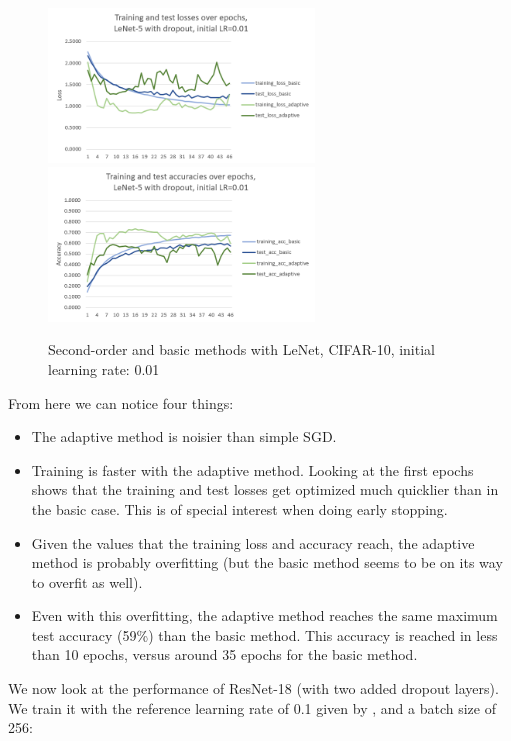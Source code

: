 \documentclass{article}
\begin{document}
  \begin{figure}[!h]
  	\includegraphics[width=200pt]{loss_lenet_d_0_01.png}
  	\includegraphics[width=200pt]{acc_lenet_d_0_01.png}
  	\caption{Second-order and basic methods with LeNet, CIFAR-10, initial learning rate: 0.01}
  \end{figure}

  From here we can notice four things:\\
  \begin{itemize}
  	\item The adaptive method is noisier than simple SGD.
  	\item Training is faster with the adaptive method. Looking at the first epochs shows that the training and test losses get optimized much quicklier than in the basic case. This is of special interest when doing early stopping.
  	\item Given the values that the training loss and accuracy reach, the adaptive method is probably overfitting (but the basic method seems to be on its way to overfit as well).
  	\item Even with this overfitting, the adaptive method reaches the same maximum test accuracy (59\%) than the basic method. This accuracy is reached in less than 10 epochs, versus around 35 epochs for the basic method. 
  \end{itemize}

  We now look at the performance of ResNet-18 (with two added dropout layers). We train it with the reference learning rate of 0.1 given by \cite{he2016deep}, and a batch size of 256:
  
\end{document}
